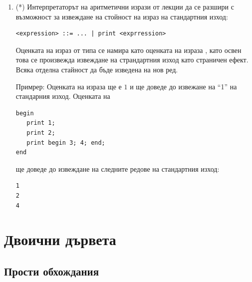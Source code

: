 \begin{enumerate}[]
\item(*) Интерпретаторът на аритметични изрази от лекции да се разшири с възможност за извеждане на стойност на израз на стандартния изход:
\begin{flushleft}
  \begin{lstlisting}[mathescape]
<expression> ::= ... | print <exprression>
  \end{lstlisting}
\end{flushleft}

Оценката на израз от типа  се намира като оценката на израза , като освен това се произвежда извеждане на страндартния изход като страничен ефект. Всяка отделна стайност да бъде изведена на нов ред.

Примрер: Оценката на израза  ще е $1$ и ще доведе до извежане на ``1'' на стандарния изход. Оценката на 

\begin{flushleft}
  \begin{lstlisting}[mathescape]
begin 
   print 1; 
   print 2; 
   print begin 3; 4; end;
end
  \end{lstlisting}
\end{flushleft}
ще доведе до извеждане на следните редове на стандартния изход: 
\begin{flushleft}
  \begin{lstlisting}[mathescape]
1
2
4
  \end{lstlisting}
\end{flushleft}

\end{enumerate}

\section {Двоични дървета}

\subsection {Прости обхождания}

